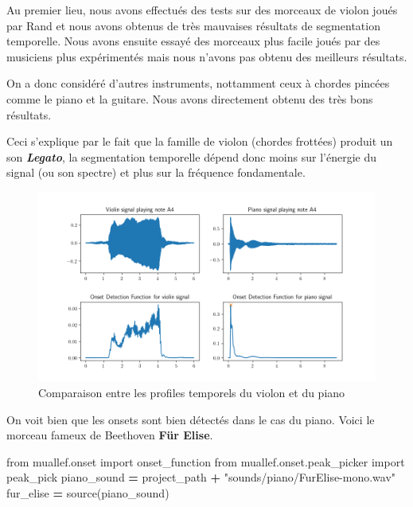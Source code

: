 \documentclass[french,]{article}
\newenvironment{Shaded}{\begin{snugshade}}{\end{snugshade}}
\newcommand{\ImportTok}[1]{#1}
\newcommand{\NormalTok}[1]{#1}
\newcommand{\OperatorTok}[1]{\textcolor[rgb]{0.81,0.36,0.00}{\textbf{#1}}}
\newcommand{\StringTok}[1]{\textcolor[rgb]{0.31,0.60,0.02}{#1}}
\begin{document}
Au premier lieu, nous avons effectués des tests sur des morceaux de
violon joués par Rand et nous avons obtenus de très mauvaises résultats
de segmentation temporelle. Nous avons ensuite essayé des morceaux plus
facile joués par des musiciens plus expérimentés mais nous n'avons pas
obtenu des meilleurs résultats.

On a donc considéré d'autres instruments, nottamment ceux à chordes
pincées comme le piano et la guitare. Nous avons directement obtenu des
très bons résultats.

Ceci s'explique par le fait que la famille de violon (chordes frottées)
produit un son \textbf{\emph{Legato}}, la segmentation temporelle dépend
donc moins sur l'énergie du signal (ou son spectre) et plus sur la
fréquence fondamentale.

\begin{figure}
\centering
\includegraphics{../../figures/out/onset.png}
\caption{Comparaison entre les profiles temporels du violon et du piano}
\end{figure}

On voit bien que les onsets sont bien détectés dans le cas du piano.
Voici le morceau fameux de Beethoven \textbf{Für Elise}.

\begin{Shaded}
\begin{Highlighting}[]
\ImportTok{from}\NormalTok{ muallef.onset }\ImportTok{import}\NormalTok{ onset_function}
\ImportTok{from}\NormalTok{ muallef.onset.peak_picker }\ImportTok{import}\NormalTok{ peak_pick}
\NormalTok{piano_sound }\OperatorTok{=}\NormalTok{ project_path }\OperatorTok{+} \StringTok{"sounds/piano/FurElise-mono.wav"}
\NormalTok{fur_elise }\OperatorTok{=}\NormalTok{ source(piano_sound)}
\end{Highlighting}
\end{Shaded}
\end{document}

